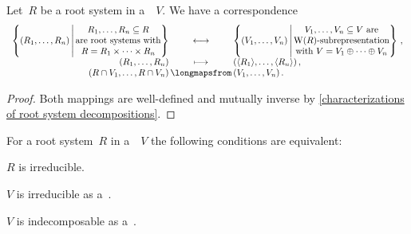 \begin{corollary}
  \label{decomposition corresponding to decomposition}
  Let~$R$ be a root system in a~{\vectorspace{$\kf$}}~$V$.
  We have a {\onetoone} correspondence
  \[
    \begin{array}{r@{\,}c@{\,}l}
      \left\{
        (R_1, \dotsc, R_n)
      \suchthat*
        \begin{tabular}{@{}c@{}}
          $R_1, \dotsc, R_n \subseteq R$ \\
          are root systems with \\
          $R = R_1 \times \dotsb \times R_n$
        \end{tabular}
      \right\}
      &\longonetoone&
      \left\{
        (V_1, \dotsc, V_n)
      \suchthat*
        \begin{tabular}{@{}c@{}}
          $V_1, \dotsc, V_n \subseteq V$ are \\
          {\subrepresentations{$\Weyl(R)$}} \\
          with~$V = V_1 \oplus \dotsb \oplus V_n$
        \end{tabular}
      \right\} \,,
      \\
      (R_1, \dotsc, R_n)
      &\longmapsto&
      (\gen{R_1}, \dotsc, \gen{R_n}) \,,
      \\
      (R \cap V_1, \dotsc, R \cap V_n)
      &\longmapsfrom&
      (V_1, \dotsc, V_n) \,.
    \end{array}
  \]
\end{corollary}


\begin{proof}
  Both mappings are well-defined and mutually inverse by \cref{characterizations of root system decompositions}.
\end{proof}


\begin{corollary}
  \label{irreducible iff irreducible}
  For a root system~$R$ in a~{\vectorspace{$\kf$}}~$V$ the following conditions are equivalent:
  \begin{equivalenceslist}
    \item
      \label{root system is irreducible}
      $R$ is irreducible.
    \item
      \label{irrep of weyl group}
      $V$ is irreducible as a~{}.
    \item
      \label{indecomp of weyl group}
      $V$ is indecomposable as a~{}.
  \end{equivalenceslist}
\end{corollary}


